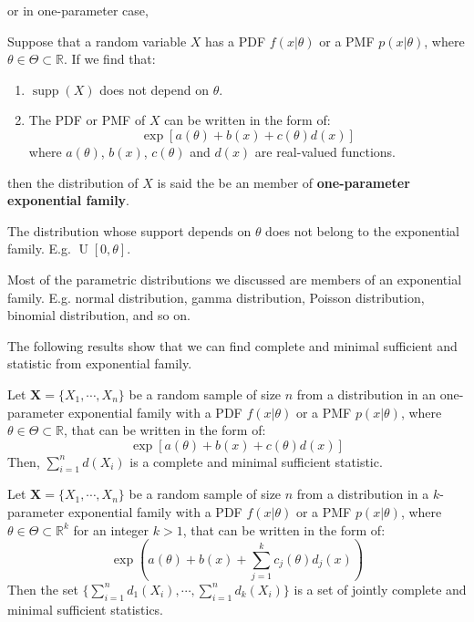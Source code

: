 \documentclass{huhtakm-template-book-v2}
\DeclareMathOperator{\supp}{supp}
\DeclareMathOperator{\U}{U}
\begin{document}
\newpage
or in one-parameter case,
\begin{defn}
	Suppose that a random variable $X$ has a PDF $f(x|\theta)$ or a PMF $p(x|\theta)$, where $\theta\in\Theta\subset\mathbb{R}$. If we find that:
	\begin{enumerate}
		\item $\supp(X)$ does not depend on $\theta$.
		\item The PDF or PMF of $X$ can be written in the form of:
		\begin{equation*}
			\exp[a(\theta)+b(x)+c(\theta)d(x)]
		\end{equation*}
		where $a(\theta)$, $b(x)$, $c(\theta)$ and $d(x)$ are real-valued functions.
	\end{enumerate}
	then the distribution of $X$ is said the be an member of \textbf{one-parameter exponential family}.
\end{defn}
\begin{rem}
	The distribution whose support depends on $\theta$ does not belong to the exponential family. E.g. $\U[0,\theta]$.
\end{rem}
\begin{rem}
	Most of the parametric distributions we discussed are members of an exponential family. E.g. normal distribution, gamma distribution, Poisson distribution, binomial distribution, and so on.
\end{rem}
The following results show that we can find complete and minimal sufficient and statistic from exponential family.
\begin{thm}
	\label{Chapter 3 (Theorem) Exponential family to complete and minimal sufficient statistic}
	Let $\mathbf{X}=\{X_{1},\cdots,X_{n}\}$ be a random sample of size $n$ from a distribution in an one-parameter exponential family with a PDF $f(x|\theta)$ or a PMF $p(x|\theta)$, where $\theta\in\Theta\subset\mathbb{R}$, that can be written in the form of:
	\begin{equation*}
		\exp[a(\theta)+b(x)+c(\theta)d(x)]
	\end{equation*}
	Then, $\sum_{i=1}^{n}d(X_{i})$ is a complete and minimal sufficient statistic.
\end{thm}
\begin{thm}
	\label{Chapter 3 (Theorem) Exponential family to jointly complete and minimal sufficient statistics}
	Let $\mathbf{X}=\{X_{1},\cdots,X_{n}\}$ be a random sample of size $n$ from a distribution in a $k$-parameter exponential family with a PDF $f(x|\theta)$ or a PMF $p(x|\theta)$, where $\theta\in\Theta\subset\mathbb{R}^{k}$ for an integer $k>1$, that can be written in the form of:
	\begin{equation*}
		\exp\left(a(\theta)+b(x)+\sum_{j=1}^{k}c_{j}(\theta)d_{j}(x)\right)
	\end{equation*}
	Then the set $\{\sum_{i=1}^{n}d_{1}(X_{i}),\cdots,\sum_{i=1}^{n}d_{k}(X_{i})\}$ is a set of jointly complete and minimal sufficient statistics.
\end{thm}
\end{document}

